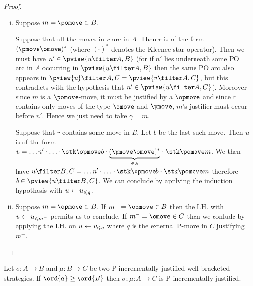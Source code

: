 \begin{proof}
\begin{enumerate}[i.]
\item Suppose $m = \pomove \in B$.

Suppose that all the moves in $r$ are in $A$. Then $r$ is of the form $(\pmove \omove)^*$ (where $(\cdot)^*$ denotes the Kleenee star operator). 
Then we must have $n'\in \pview{u\filter A,B}$
(for if $n'$ lies underneath some PO arc in $A$ occurring in $\pview{u\filter A,B}$ then the same PO arc 
also appears in $\pview{u}\filter A,C = \pview{u\filter A,C}$,
but this contradicts with the hypothesis that $n' \in \pview{u\filter A,C}$). Moreover since $m$ is a $\pomove$-move, it must be justified by a $\opmove$ and since $r$ contains only moves of the type $\omove$ and $\pmove$, $m$'s justifier must occur before $n'$.
Hence we just need to take $\gamma = m$. 

Suppose that $r$ contains some move in $B$. Let $b$ be the last such move. Then $u$ is of the form $u = \ldots n' \cdot \ldots \cdot \stk\opmove  b \cdot \underbrace{(\pmove \omove)^*}_{\in A} \cdot\ \stk\pomove m $. We then have
$u\filter B,C = \ldots n' \cdot \ldots \cdot \stk\opmove  b \cdot \stk\pomove m $ therefore $b \in \pview{u\filter B,C}$. We can conclude by applying the induction hypothesis with $u \leftarrow u_{\leqslant q}$.

\item Suppose $m = \opmove \in B$.
If $m^- = \opmove \in B$ then the I.H. with $u \leftarrow u_{\leqslant m^-}$ permits us to conclude.
If $m^- = \omove \in C$ then we conlude by applying  the I.H. on $u \leftarrow u_{\leqslant q}$ where $q$ is the external P-move in $C$ justifying
$m^-$.
\end{enumerate}
\end{proof}

\begin{conjecture}
Let $\sigma : A \rightarrow B$ and $\mu : B \rightarrow C$
be two P-incrementally-justified well-bracketed
strategies. 
If $\ord{a} \geq \ord{B}$ then $\sigma ; \mu : A\rightarrow C$
is P-incrementally-justified.
\end{conjecture}

